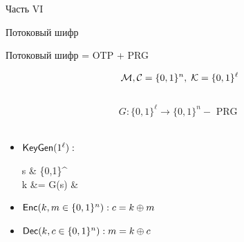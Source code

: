 \documentclass[usenames,dvipsnames,8pt,aspectratio=169]{beamer}
\begin{document}
\begin{frame}
Часть VI \\ [10pt]
\begin{LARGE}
	
	\color{Orange}
	\Huge Потоковый шифр
	
\end{LARGE}
\end{frame}

\begin{frame}{Потоковый шифр = OTP + PRG}
\LARGE

\[\mathcal{M}, \mathcal{C} = \{0,1\}^n, \; \mathcal{K} = \{0,1\}^{\ell}\] \\
\[G : \{0,1\}^{\ell}  \rightarrow \{0,1\}^{n} - \text{ PRG } \] \\
\begin{itemize}
	\item $\textsf{KeyGen}(1^{\ell}): $ \\[-20pt]
	\begin{flalign*} 
	s  &\xleftarrow{\$} \{0,1\}^\ell  \\
	k &= G(s)  & 
	\end{flalign*}
	\item $\textsf{Enc}(k, m \in \{0,1\}^n): c = k \oplus m$ \\[10pt]
	\item $\textsf{Dec}(k, c \in \{0,1\}^n): m = k \oplus c$ \\[10pt]
\end{itemize}
\end{frame}
\end{document}
